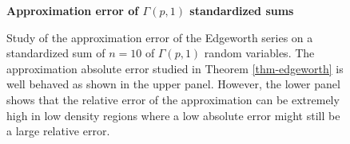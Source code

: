 \begin{example}
    \begin{figure}[!htbp]
        \textbf{Approximation error of $\Gamma(p,1)$ standardized sums}
        \centering
        \qquad
        \caption{Study of the approximation error of the Edgeworth series on a standardized sum of $n=10$ of $\Gamma(p, 1)$ random variables. The approximation absolute error studied in Theorem \ref{thm-edgeworth} is well behaved as shown in the upper panel. However, the lower panel shows that the relative error of the approximation can be extremely high in low density regions where a low absolute error might still be a large relative error.}
        \label{fig-edgeworth-err}
    \end{figure}
\end{example}